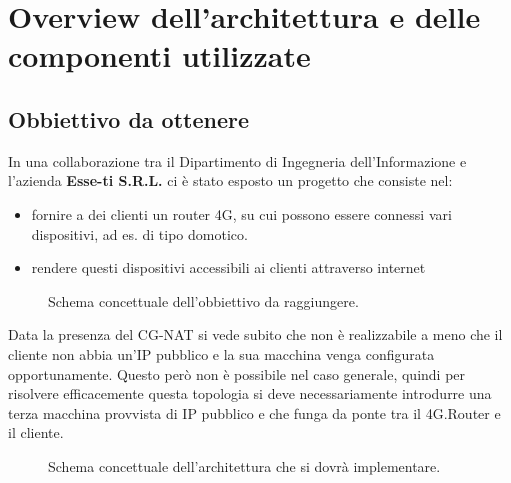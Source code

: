 

\chapter{Overview dell'architettura e delle componenti utilizzate}
\setlength{\parskip}{1em}
\setlength{\parindent}{0em}
\renewcommand{\baselinestretch}{1.15}

\label{ch:overview}

\section{Obbiettivo da ottenere}

In una collaborazione tra il Dipartimento di Ingegneria dell'Informazione e l'azienda \textbf{Esse-ti S.R.L.} ci \`e stato esposto un progetto che consiste nel:

\begin{itemize}
	\item fornire a dei clienti un router 4G, su cui possono essere connessi vari dispositivi, ad es. di tipo domotico.
	\item rendere questi dispositivi accessibili ai clienti attraverso internet
\end{itemize}

\begin{figure}[ht]
	\centering
	
	\caption{Schema concettuale dell'obbiettivo da raggiungere. \cite{icons}}

	\label{fig:schema_concettuale}

\end{figure}

Data la presenza del CG-NAT si vede subito che non \`e realizzabile a meno che il cliente non abbia un'IP pubblico e la sua macchina venga configurata opportunamente. Questo per\`o non \`e possibile nel caso generale, quindi per risolvere efficacemente questa topologia si deve necessariamente introdurre una terza macchina provvista di IP pubblico e che funga da ponte tra il 4G.Router e il cliente.


\begin{figure}[ht]
	\centering
	
	\caption{Schema concettuale dell'architettura che si dovr\`a implementare. \cite{icons}}

	\label{fig:schem_architettura_reale}

\end{figure}

